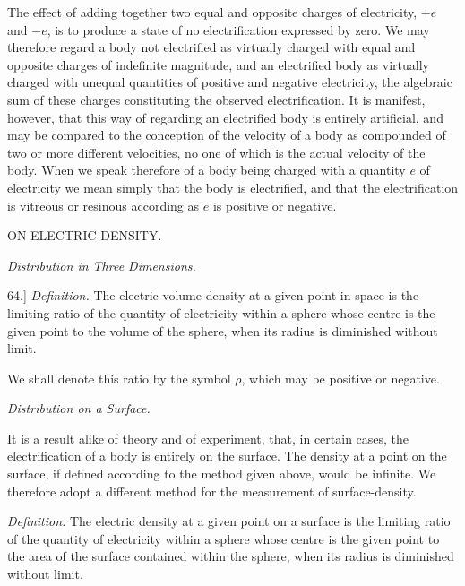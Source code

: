 \documentclass[11pt,a4paper]{article}
\begin{document}
The effect of adding together two equal and opposite charges of
electricity, \(+e\) and \(-e\), is to produce a state of no electrification
expressed by zero. We may therefore regard a body not electrified as
virtually charged with equal and opposite charges of indefinite
magnitude, and an electrified body as virtually charged with unequal
quantities of positive and negative electricity, the algebraic sum of
these charges constituting the observed electrification. It is manifest,
however, that this way of regarding an electrified body is entirely
artificial, and may be compared to the conception of the velocity of a
body as compounded of two or more different velocities, no one of which
is the actual velocity of the body. When we speak therefore of a body
being charged with a quantity \(e\) of electricity we mean simply that
the body is electrified, and that the electrification is vitreous or
resinous according as \(e\) is positive or negative.

\clearpage
\setcounter{footnote}{0}

\begin{center}
ON ELECTRIC DENSITY.
\end{center}

\begin{center}
\textit{Distribution in Three Dimensions.}
\end{center}

64.] \textit{Definition.} The electric volume-density at a given point in
space is the limiting ratio of the quantity of electricity within a
sphere whose centre is the given point to the volume of the sphere,
when its radius is diminished without limit.

We shall denote this ratio by the symbol \(\rho\), which may be positive
or negative.

\begin{center}
\textit{Distribution on a Surface.}
\end{center}

It is a result alike of theory and of experiment, that, in certain cases,
the electrification of a body is entirely on the surface. The density
at a point on the surface, if defined according to the method given
above, would be infinite. We therefore adopt a different method for
the measurement of surface-density.

\textit{Definition.} The electric density at a given point on a surface is
the limiting ratio of the quantity of electricity within a sphere whose
centre is the given point to the area of the surface contained within
the sphere, when its radius is diminished without limit.
\end{document}

